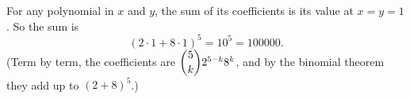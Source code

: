 For any polynomial in $x$ and $y$, the sum of its coefficients is its value at $x=y=1$. So the sum is
\[
(2\cdot1+8\cdot1)^5=10^5=\boxed{100000} .
\]
(Term by term, the coefficients are $\dbinom5k2^{5-k}8^k$, and by the binomial theorem they add up to $(2+8)^5$.)
